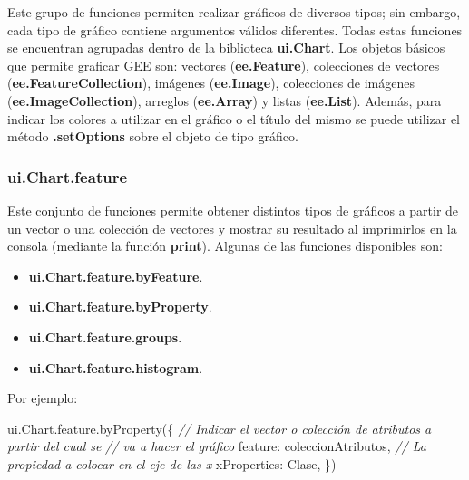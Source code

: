 \documentclass[
  12pt,
  letterpaper,
  twoside]{book}
\newenvironment{Shaded}{\begin{snugshade}}{\end{snugshade}}
\newcommand{\AttributeTok}[1]{\textcolor[rgb]{0.48,0.12,0.64}{#1}}
\newcommand{\CommentTok}[1]{\textcolor[rgb]{0.24,0.58,0.00}{\textit{#1}}}
\newcommand{\DataTypeTok}[1]{\textcolor[rgb]{0.00,0.00,0.00}{#1}}
\newcommand{\FunctionTok}[1]{\textcolor[rgb]{0.48,0.12,0.64}{#1}}
\newcommand{\KeywordTok}[1]{\textcolor[rgb]{0.48,0.12,0.64}{#1}}
\newcommand{\NormalTok}[1]{#1}
\newcommand{\OperatorTok}[1]{\textcolor[rgb]{0.00,0.00,0.00}{#1}}
\newcommand{\StringTok}[1]{\textcolor[rgb]{0.87,0.29,0.22}{#1}}
\providecommand{\tightlist}{%
  \setlength{\itemsep}{0pt}\setlength{\parskip}{0pt}}
\newcommand\boldpurple[1]{\textcolor{darkpurple}{\textbf{#1}}}
\begin{document}
Este grupo de funciones permiten realizar gráficos de diversos tipos; sin embargo, cada tipo de gráfico contiene argumentos válidos diferentes. Todas estas funciones se encuentran agrupadas dentro de la biblioteca \boldpurple{ui.Chart}. Los objetos básicos que permite graficar GEE son: vectores (\boldpurple{ee.Feature}), colecciones de vectores (\boldpurple{ee.FeatureCollection}), imágenes (\boldpurple{ee.Image}), colecciones de imágenes (\boldpurple{ee.ImageCollection}), arreglos (\boldpurple{ee.Array}) y listas (\boldpurple{ee.List}). Además, para indicar los colores a utilizar en el gráfico o el título del mismo se puede utilizar el método \boldpurple{.setOptions} sobre el objeto de tipo gráfico.

\hypertarget{ui.chart.feature}{%
\subsubsection*{ui.Chart.feature}\label{ui.chart.feature}}

Este conjunto de funciones permite obtener distintos tipos de gráficos a partir de un vector o una colección de vectores y mostrar su resultado al imprimirlos en la consola (mediante la función \boldpurple{print}). Algunas de las funciones disponibles son:

\begin{itemize}
\tightlist
\item
  \boldpurple{ui.Chart.feature.byFeature}.
\item
  \boldpurple{ui.Chart.feature.byProperty}.
\item
  \boldpurple{ui.Chart.feature.groups}.
\item
  \boldpurple{ui.Chart.feature.histogram}.
\end{itemize}

Por ejemplo:

\begin{Shaded}
\begin{Highlighting}[]
\KeywordTok{ui}\OperatorTok{.}\AttributeTok{Chart}\OperatorTok{.}\AttributeTok{feature}\OperatorTok{.}\FunctionTok{byProperty}\NormalTok{(\{}
  \CommentTok{// Indicar el vector o colección de atributos a partir del cual se }
  \CommentTok{// va a hacer el gráfico}
  \DataTypeTok{feature}\OperatorTok{:}\NormalTok{ coleccionAtributos}\OperatorTok{,} 
  \CommentTok{// La propiedad a colocar en el eje de las x}
  \DataTypeTok{xProperties}\OperatorTok{:} \StringTok{\textquotesingle{}Clase\textquotesingle{}}\OperatorTok{,}
\NormalTok{\})}
\end{Highlighting}
\end{Shaded}
\end{document}
